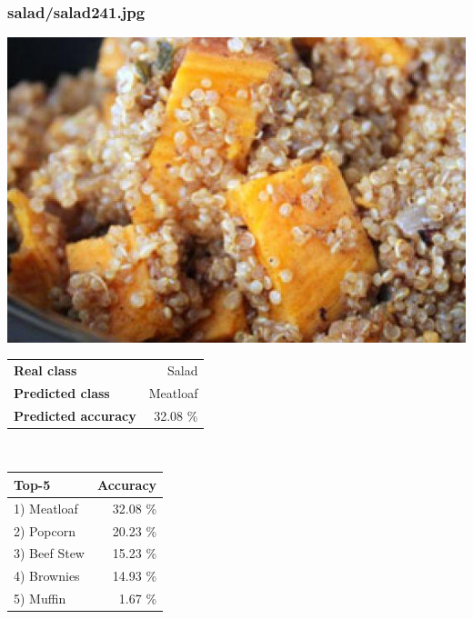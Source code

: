 \subsubsection{salad/salad241.jpg}

\begin{minipage}[t]{0.4\textwidth}
	\vspace{0pt}
	\includegraphics[width=\linewidth]{images/evaluation-images/salad/salad241.jpg}
\end{minipage}
\hfill
\begin{minipage}[t]{0.5\textwidth}
	\vspace{0pt}\raggedright
	\begin{tabularx}{\textwidth}{X r}
		\small \textbf{Real class} & \small Salad\\
		\small \textbf{Predicted class} & \small Meatloaf\\
		\small \textbf{Predicted accuracy} & \small 32.08 \%
    \end{tabularx}\\
    
    \vspace{6pt}
	\begin{tabularx}{\textwidth}{X r}
        \small \textbf{Top-5} & \small \textbf{Accuracy} \\
        \hline
		\small 1) Meatloaf & \small 32.08 \%\\\small 2) Popcorn & \small 20.23 \%\\\small 3) Beef Stew & \small 15.23 \%\\\small 4) Brownies & \small 14.93 \%\\\small 5) Muffin & \small 1.67 \%
    \end{tabularx}
\end{minipage}
    
